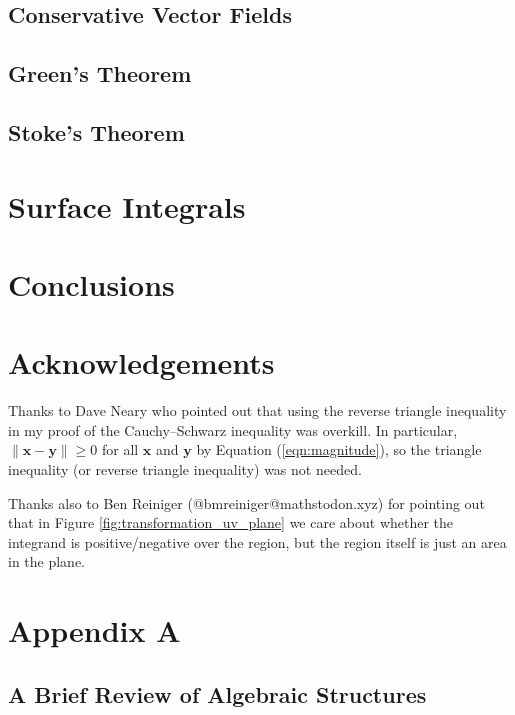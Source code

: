 \documentclass{article}
\theoremstyle{definition}
\begin{document}
\subsection{Conservative Vector Fields}

\subsection{Green’s Theorem}

\subsection{Stoke's Theorem}


\bigskip
\section{Surface Integrals}

\bigskip
\section{Conclusions}
\label{sec:conclusions}

\section*{Acknowledgements}
Thanks to Dave Neary who pointed out that using the reverse
triangle inequality in my proof of the Cauchy–Schwarz inequality
was overkill. In particular, $\|\mathbf{x} - \mathbf{y} \| \geq
0$ for all $\mathbf{x}$ and $\mathbf{y}$ by Equation
(\ref{eqn:magnitude}), so the triangle inequality (or reverse
triangle inequality) was not needed.

\bigskip
\noindent
Thanks also to Ben Reiniger (@bmreiniger@mathstodon.xyz) for 
pointing out that in Figure \ref{fig:transformation_uv_plane} 
we care about whether the integrand is positive/negative 
over the region, but the region itself is just an area in 
the plane.


\section*{Appendix A}
\subsection*{A Brief Review of Algebraic Structures}
\end{document}
